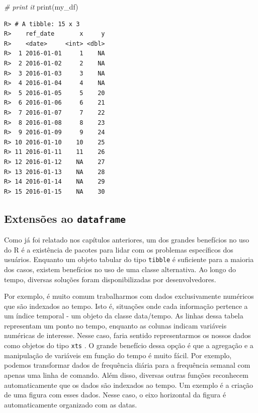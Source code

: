 \documentclass[
  11pt,
]{book}
\newenvironment{Shaded}{\begin{snugshade}}{\end{snugshade}}
\newcommand{\CommentTok}[1]{\textcolor[rgb]{0.37,0.37,0.37}{\textit{#1}}}
\newcommand{\FunctionTok}[1]{\textcolor[rgb]{0,0,0}{#1}}
\newcommand{\NormalTok}[1]{#1}
\begin{document}
\begin{Shaded}
\begin{Highlighting}[]
\CommentTok{\# print it}
\FunctionTok{print}\NormalTok{(my\_df)}
\end{Highlighting}
\end{Shaded}

\begin{verbatim}
R> # A tibble: 15 x 3
R>    ref_date       x     y
R>    <date>     <int> <dbl>
R>  1 2016-01-01     1    NA
R>  2 2016-01-02     2    NA
R>  3 2016-01-03     3    NA
R>  4 2016-01-04     4    NA
R>  5 2016-01-05     5    20
R>  6 2016-01-06     6    21
R>  7 2016-01-07     7    22
R>  8 2016-01-08     8    23
R>  9 2016-01-09     9    24
R> 10 2016-01-10    10    25
R> 11 2016-01-11    11    26
R> 12 2016-01-12    NA    27
R> 13 2016-01-13    NA    28
R> 14 2016-01-14    NA    29
R> 15 2016-01-15    NA    30
\end{verbatim}

\hypertarget{extensuxf5es-ao-dataframe}{%
\subsection{\texorpdfstring{Extensões ao \texttt{dataframe}}{Extensões ao dataframe}}\label{extensuxf5es-ao-dataframe}}

Como já foi relatado nos capítulos anteriores, um dos grandes benefícios no uso do R é a existência de pacotes para lidar com os problemas específicos dos usuários. Enquanto um objeto tabular do tipo \texttt{tibble} é suficiente para a maioria dos casos, existem benefícios no uso de uma classe alternativa. Ao longo do tempo, diversas soluções foram disponibilizadas por desenvolvedores.

Por exemplo, é muito comum trabalharmos com dados exclusivamente numéricos que são indexados ao tempo. Isto é, situações onde cada informação pertence a um índice temporal - um objeto da classe data/tempo. As linhas dessa tabela representam um ponto no tempo, enquanto as colunas indicam variáveis numéricas de interesse. Nesse caso, faria sentido representarmos os nossos dados como objetos do tipo \texttt{xts} \citep{R-xts}. O grande benefício dessa opção é que a agregação e a manipulação de variáveis em função do tempo é muito fácil. Por exemplo, podemos transformar dados de frequência diária para a frequência semanal com apenas uma linha de comando. Além disso, diversas outras funções reconhecem automaticamente que os dados são indexados ao tempo. Um exemplo é a criação de uma figura com esses dados. Nesse caso, o eixo horizontal da figura é automaticamente organizado com as datas.
\end{document}
